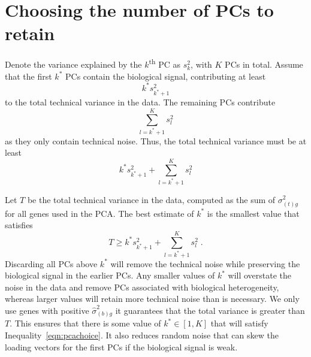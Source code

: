\documentclass{article}
\begin{document}

\section{Choosing the number of PCs to retain}
Denote the variance explained by the $k$\textsuperscript{th} PC as $s^2_k$, with $K$ PCs in total.
Assume that the first $k^*$ PCs contain the biological signal, contributing at least
\[
    k^* s^2_{k^*+1}
\]
to the total technical variance in the data. 
The remaining PCs contribute
\[
    \sum_{l=k^*+1}^K s^2_l 
\]
as they only contain technical noise.
Thus, the total technical variance must be at least
\[
    k^* s^2_{k^*+1} + \sum_{l=k^*+1}^K s^2_l 
\]

Let $T$ be the total technical variance in the data, computed as the sum of $\sigma^2_{(t)g}$ for all genes used in the PCA.
The best estimate of $k^*$ is the smallest value that satisfies 
\begin{equation}
    T \ge k^* s^2_{k^*+1} + \sum_{l=k^*+1}^K s^2_l  \label{eqn:pcachoice} \;.
\end{equation}
Discarding all PCs above $k^*$ will remove the technical noise while preserving the biological signal in the earlier PCs.
Any smaller values of $k^*$ will overstate the noise in the data and remove PCs associated with biological heterogeneity,
whereas larger values will retain more technical noise than is necessary. 
We only use genes with positive $\hat\sigma^2_{(b)g}$ it guarantees that the total variance is greater than $T$.
This ensures that there is some value of $k^* \in [1, K]$ that will satisfy Inequality~\ref{eqn:pcachoice}.
It also reduces random noise that can skew the loading vectors for the first PCs if the biological signal is weak.
\end{document}
